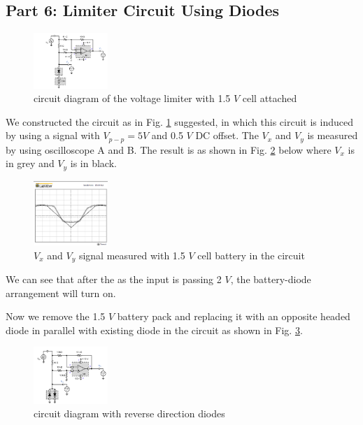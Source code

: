 \documentclass[letterpaper, 10 pt, conference]{ieeeconf}  %
\begin{document}
\subsection{Part 6: Limiter Circuit Using Diodes}
\begin{figure}[ht]
  \centering
  \includegraphics[width=0.25\textwidth]{images/6_1.png}
  \caption{circuit diagram of the voltage limiter with 1.5 $V$ cell attached}
  \label{fig:6.1}
\end{figure}
We constructed the circuit as in Fig. \ref{fig:6.1} suggested, in which
this circuit is induced by using a signal with $V_{p-p} = 5 V$ and 0.5 $V$ DC offset.
The $V_{x}$ and $V_{y}$ is measured by using oscilloscope A and B. The result is
as shown in Fig. \ref{fig:6.2} below where $V_{x}$ is in grey and $V_{y}$ is in black.
\begin{figure}[ht]
  \centering
  \includegraphics[width=0.25\textwidth]{images/6_2.png}
  \caption{$V_{x}$ and $V_{y}$ signal measured with 1.5 $V$ cell battery in the circuit}
  \label{fig:6.2}
\end{figure}
\par We can see that after the as the input is passing 2 $V$, the battery-diode arrangement will turn on.
\par Now we remove the 1.5 $V$ battery pack and replacing it with an opposite
headed diode in parallel with existing diode in the circuit as shown in  Fig. \ref{fig:6.3}.
\begin{figure}[ht]
  \centering
  \includegraphics[width=0.25\textwidth]{images/6_3.png}
  \caption{circuit diagram with reverse direction diodes}
  \label{fig:6.3}
\end{figure}
\end{document}
